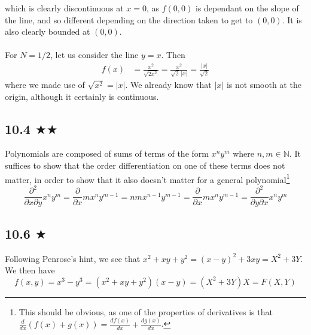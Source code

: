 which is clearly discontinuous at $x=0$, as $f(0,0)$ is dependant on the slope of the line, and so different depending on the direction taken to get to $(0,0)$. It is also clearly bounded at $(0,0)$. \\ \\ For $N=1/2$, let us consider the line $y=x$. Then
\begin{align*}
f(x)&=\frac{x^2}{\sqrt{2x^2}}=\frac{x^2}{\sqrt{2}\, |x|}=\frac{|x|}{\sqrt{2}}
\end{align*}
where we made use of $\sqrt{x^2}=|x|$. We already know that $|x|$ is not smooth at the origin, although it certainly is continuous.


\subsection{10.4 $\bigstar\bigstar$}
Polynomials are composed of sums of terms of the form $x^n y^m$ where $n,m\in \mathbb{N}$. It suffices to show that the order differentiation on one of these terms does not matter, in order to show that it also doesn't matter for a general polynomial\footnote{This should be obvious, as one of the properties of derivatives is that $\frac{d}{dx}(f(x)+g(x))=\frac{d f(x)}{dx}+\frac{d g(x)}{dx}$.}
$$\frac{\partial^2}{\partial x \partial y} x^n y^m =\frac{\partial}{\partial x }mx^ny^{m-1}=nm x^{n-1}y^{m-1}=\frac{\partial}{\partial x }mx^ny^{m-1}=\frac{\partial^2}{\partial y \partial x} x^n y^m$$


\subsection{10.6 $\bigstar$}
Following Penrose's hint, we see that $x^2+xy+y^2=(x-y)^2+3xy=X^2+3Y$. We then have $$f(x,y)=x^3-y^3=(x^2+xy+y^2)(x-y)=(X^2+3Y)X=F(X,Y)$$


